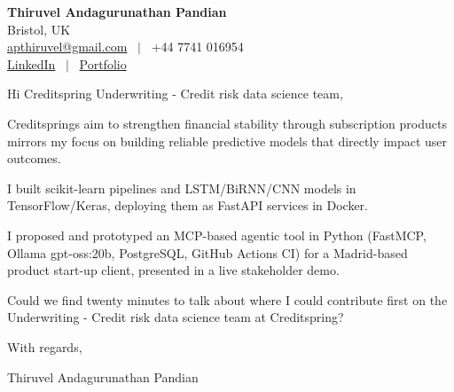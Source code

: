 \documentclass[11pt,a4paper]{article}
\begin{document}
\raggedright
\pagestyle{empty}

\begin{center}
    {\LARGE \color{linkblue} \textbf{Thiruvel Andagurunathan Pandian}}\\[0.2cm]
    Bristol, UK \\
    \href{mailto:apthiruvel@gmail.com}{apthiruvel@gmail.com} \ $|$ \ +44 7741 016954 \\
\href{https://www.linkedin.com/in/thiruvel-a-p/}{LinkedIn} \ $|$ \ \href{https://thiruvel-ap.github.io/PersonalPortfolio/}{Portfolio}
\end{center}

\vspace{0.4cm}

\noindent
Hi Creditspring Underwriting - Credit risk data science team,

Creditspring\textquotesingle{}s aim to strengthen financial stability through subscription products mirrors my focus on building reliable predictive models that directly impact user outcomes.

I built scikit-learn pipelines and LSTM/BiRNN/CNN models in TensorFlow/Keras, deploying them as FastAPI services in Docker.

I proposed and prototyped an MCP-based agentic tool in Python (FastMCP, Ollama gpt-oss:20b, PostgreSQL, GitHub Actions CI) for a Madrid-based product start-up client, presented in a live stakeholder demo.

Could we find twenty minutes to talk about where I could contribute first on the Underwriting - Credit risk data science team at Creditspring?

\vspace{0.5cm}

With regards,

Thiruvel Andagurunathan Pandian
\end{document}

